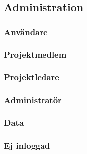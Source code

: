 \documentclass[a4paper]{article}
\begin{document}
\begin{FT}






\subsection{Administration}


\subsubsection{Användare}
\subsubsection{Projektmedlem}
\subsubsection{Projektledare}
\subsubsection{Administratör}
\subsubsection{Data}
\subsubsection{Ej inloggad}


\end{FT}



\newpage
\end{document}
